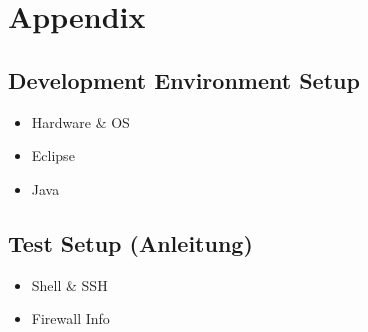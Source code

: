 \section{Appendix}

\subsection{Development Environment Setup}
\begin{itemize}
\item Hardware \& OS
\item Eclipse
\item Java
\end{itemize}
	
\subsection{Test Setup (Anleitung)}
\begin{itemize}
\item Shell \& SSH
\item Firewall Info
\end{itemize}	

